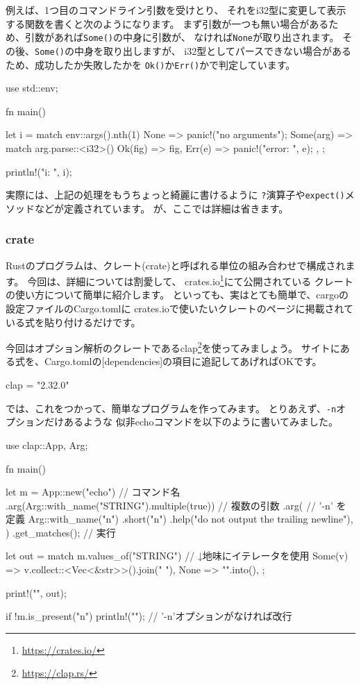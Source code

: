 \documentclass[mingoth,a4paper]{jsarticle}
\begin{document}
例えば、1つ目のコマンドライン引数を受けとり、
それをi32型に変更して表示する関数を書くと次のようになります。
まず引数が一つも無い場合があるため、引数があれば\texttt{Some()}の中身に引数が、
なければ\texttt{None}が取り出されます。
その後、\texttt{Some()}の中身を取り出しますが、
i32型としてパースできない場合があるため、成功したか失敗したかを
\texttt{Ok()}か\texttt{Err()}かで判定しています。

\begin{commandline}
use std::env;

fn main() {
    let i = match env::args().nth(1) {
        None => {
            panic!("no arguments");
        }
        Some(arg) => match arg.parse::<i32>() {
            Ok(fig) => fig,
            Err(e) => {
                panic!("error: {}", e);
            }
        },
    };

    println!("i: {}", i);
}
\end{commandline}

実際には、上記の処理をもうちょっと綺麗に書けるように
\texttt{?}演算子や\texttt{expect()}メソッドなどが定義されています。
が、ここでは詳細は省きます。

\subsubsection{crate}

Rustのプログラムは、クレート(crate)と呼ばれる単位の組み合わせで構成されます。
今回は、詳細については割愛して、
crates.io\footnote{\url{https://crates.io/}}にて公開されている
クレートの使い方について簡単に紹介します。
といっても、実はとても簡単で、cargoの設定ファイルのCargo.tomlに
crates.ioで使いたいクレートのページに掲載されている式を貼り付けるだけです。

今回はオプション解析のクレートであるclap\footnote{\url{https://clap.rs/}}を使ってみましょう。
サイトにある式を、Cargo.tomlの[dependencies]の項目に追記してあげればOKです。

\begin{commandline}
[dependencies]
clap = "2.32.0"
\end{commandline}

では、これをつかって、簡単なプログラムを作ってみます。
とりあえず、\verb|-n|オプションだけあるような
似非echoコマンドを以下のように書いてみました。

\begin{commandline}
use clap::{App, Arg};

fn main() {
    let m = App::new("echo")  // コマンド名
        .arg(Arg::with_name("STRING").multiple(true))  // 複数の引数
        .arg( // '-n' を定義
            Arg::with_name("n")
                .short("n")
                .help("do not output the trailing newline"),
        )
        .get_matches();  // 実行

    let out = match m.values_of("STRING") {
        //         ↓地味にイテレータを使用
        Some(v) => v.collect::<Vec<&str>>().join(" "),
        None => "".into(),
    };

    print!("{}", out);

    if !m.is_present("n") {
        println!("");  // '-n'オプションがなければ改行
    }
}
\end{commandline}
\end{document}
